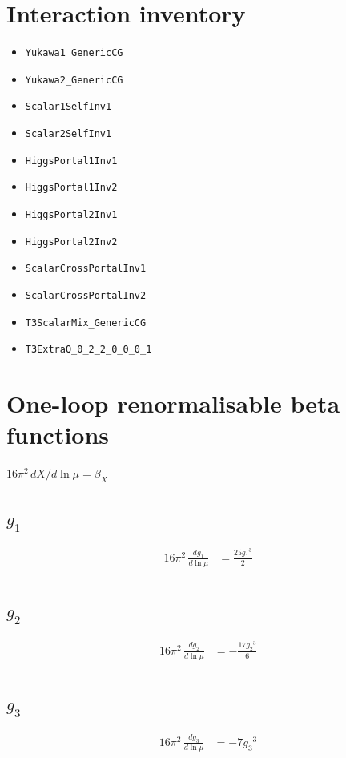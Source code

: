 \documentclass[10pt,a4paper]{article}
\begin{document}
\section*{Interaction inventory}
\begin{itemize}
\item \texttt{Yukawa1\_GenericCG}
\item \texttt{Yukawa2\_GenericCG}
\item \texttt{Scalar1SelfInv1}
\item \texttt{Scalar2SelfInv1}
\item \texttt{HiggsPortal1Inv1}
\item \texttt{HiggsPortal1Inv2}
\item \texttt{HiggsPortal2Inv1}
\item \texttt{HiggsPortal2Inv2}
\item \texttt{ScalarCrossPortalInv1}
\item \texttt{ScalarCrossPortalInv2}
\item \texttt{T3ScalarMix\_GenericCG}
\item \texttt{T3ExtraQ\_0\_2\_2\_0\_0\_0\_1}
\end{itemize}
\clearpage
\section*{One-loop renormalisable beta functions}
$16\pi^2\,dX/d\ln\mu=\beta_X$
\subsection*{$g_1$}
\begin{align*}
16\pi^2\,\frac{d g_1}{d\ln\mu} &=\frac{25 {g_1}^3}{2} \\
\end{align*}
\subsection*{$g_2$}
\begin{align*}
16\pi^2\,\frac{d g_2}{d\ln\mu} &=-\frac{17 {g_2}^3}{6} \\
\end{align*}
\subsection*{$g_3$}
\begin{align*}
16\pi^2\,\frac{d g_3}{d\ln\mu} &=-7 {g_3}^3 \\
\end{align*}
\end{document}
